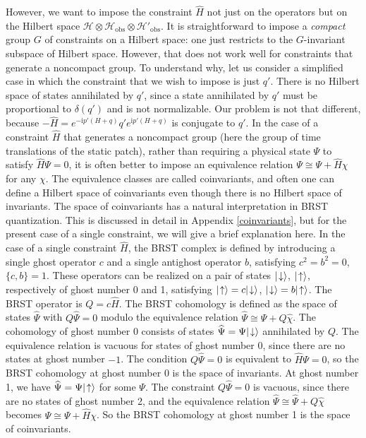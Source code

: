 \documentclass[11pt,a4paper]{article}
\def\h{\widehat}
\def\h{\widehat}
\def\H{{\mathcal H}}
\def\ra{\rangle}
\def\obs{{\mathrm{obs}}}
\def\i{{\mathrm i}}
\begin{document}
However, we want to impose the constraint $\h H$ not just on the operators but on the Hilbert space  $\H\otimes \H_\obs\otimes \H'_\obs$.   It is straightforward to impose
a {\it compact} group $G$ of constraints on a Hilbert space: one just restricts to the $G$-invariant subspace of Hilbert space.   However, that does not work well for constraints that generate a noncompact group.  To understand why, let us consider a simplified case in which the constraint that we wish to impose is
just $q'$.    There is no Hilbert space of states annihilated by $q'$, since a state annihilated by $q'$ must be proportional to $\delta(q')$ and is not normalizable.
Our problem is not that different, because $-\h H=e^{-\i p'(H+q)} q' e^{\i p'(H+q)}$ is conjugate to $q'$.    In the case of a constraint $\h H$ that generates
a noncompact group (here the group of time translations of the static patch), rather than requiring a physical state $\Psi$ to satisfy $\h H\Psi=0$, it is often
better to impose an equivalence relation $\Psi\cong \Psi+\h H\chi$ 
for any $\chi$.   The equivalence classes are called coinvariants, and often one can define a Hilbert space
of coinvariants even though there is no Hilbert space of invariants.   The space of coinvariants has a natural interpretation in BRST quantization.  This is discussed
in detail in Appendix \ref{coinvariants}, but for the present case of a single constraint, we will give a brief explanation here.   In the case of a single constraint $\h H$,
the BRST complex is defined by introducing a single ghost operator $c$ and a single antighost operator $b$, satisfying $c^2=b^2=0$, $\{c,b\}=1$.   These
operators can be realized on a pair of states $|\negthinspace\downarrow\ra$, $|\negthinspace\uparrow\ra$, respectively of ghost number 0 and 1, satisfying
$|\negthinspace \uparrow\ra =c|\negthinspace\downarrow\ra$, $|\negthinspace\downarrow\ra=b|\negthinspace\uparrow\ra$.  The BRST operator is $Q=c\h H$.
The BRST cohomology is defined as the space of states $\h\Psi$ with $Q\h\Psi=0$ modulo the equivalence relation $\h\Psi\cong\h\Psi+Q\h\chi$.
The cohomology of ghost number 0 consists of states $\h\Psi=\Psi|\negthinspace\downarrow\ra$ annihilated by $Q$.   
The equivalence relation is vacuous for states of ghost number 0,  since
there are no states at ghost number $-1$.  The condition $Q\h\Psi=0$ is equivalent to $\h H\Psi=0$,  
so the BRST cohomology at ghost number 0 is the space of invariants.   
At ghost number 1, we have $\h\Psi=\Psi|\negthinspace\uparrow\ra$ for some $\Psi$. The constraint $Q\h\Psi=0$ is vacuous, 
since there are no states of ghost number 2, and the equivalence relation
$\h\Psi\cong \h\Psi+Q\h\chi$ becomes $\Psi\cong \Psi+\h H\chi$.   So the BRST cohomology at ghost number 1 is the space of coinvariants.  
\end{document}
